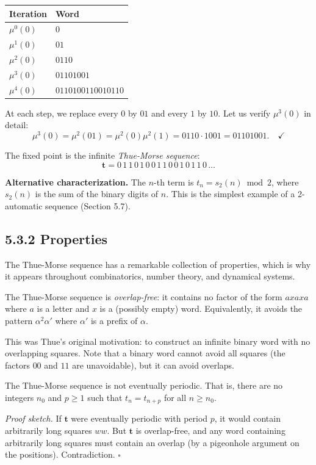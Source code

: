 \begin{example}

\begin{tabular}{|l|l|}
\hline
Iteration & Word \\
\hline
$\mu^0(0)$ & $0$ \\
$\mu^1(0)$ & $01$ \\
$\mu^2(0)$ & $0110$ \\
$\mu^3(0)$ & $01101001$ \\
$\mu^4(0)$ & $0110100110010110$ \\
\hline
\end{tabular}


At each step, we replace every $0$ by $01$ and every $1$ by $10$. Let us verify $\mu^3(0)$ in detail:
\[
\mu^3(0) = \mu^2(01) = \mu^2(0)\mu^2(1) = 0110 \cdot 1001 = 01101001. \quad\checkmark
\]

The fixed point is the infinite \textit{Thue-Morse sequence}:
\[
\mathbf{t} = 0\, 1\, 1\, 0\, 1\, 0\, 0\, 1\, 1\, 0\, 0\, 1\, 0\, 1\, 1\, 0\, \ldots
\]

\textbf{Alternative characterization.} The $n$-th term is $t_n = s_2(n) \bmod 2$, where $s_2(n)$ is the sum of the binary digits of $n$. This is the simplest example of a 2-automatic sequence (Section 5.7).
\end{example}

\subsection{5.3.2 Properties}

The Thue-Morse sequence has a remarkable collection of properties, which is why it appears throughout combinatorics, number theory, and dynamical systems.

\begin{theorem}
The Thue-Morse sequence is \textit{overlap-free}: it contains no factor of the form $axaxa$ where $a$ is a letter and $x$ is a (possibly empty) word. Equivalently, it avoids the pattern $\alpha^2 \alpha'$ where $\alpha'$ is a prefix of $\alpha$.

This was Thue's original motivation: to construct an infinite binary word with no overlapping squares. Note that a binary word cannot avoid all squares (the factors $00$ and $11$ are unavoidable), but it can avoid overlaps.
\end{theorem}

\begin{theorem}
The Thue-Morse sequence is not eventually periodic. That is, there are no integers $n_0$ and $p \geq 1$ such that $t_n = t_{n+p}$ for all $n \geq n_0$.

\textit{Proof sketch.} If $\mathbf{t}$ were eventually periodic with period $p$, it would contain arbitrarily long squares $w w$. But $\mathbf{t}$ is overlap-free, and any word containing arbitrarily long squares must contain an overlap (by a pigeonhole argument on the positions). Contradiction. $\square$
\end{theorem}

